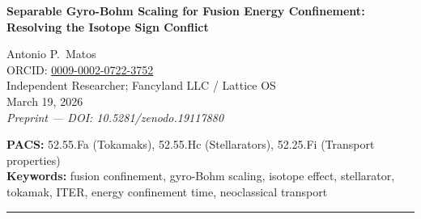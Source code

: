 \documentclass[11pt,letterpaper]{article}
\begin{document}
\begin{center}
{\LARGE\bfseries Separable Gyro-Bohm Scaling for Fusion Energy Confinement:\\[0.3em] Resolving the Isotope Sign Conflict}

\vspace{1.5em}

{\large Antonio P.\ Matos}\\[0.5em]
{\small ORCID: \href{https://orcid.org/0009-0002-0722-3752}{0009-0002-0722-3752}}\\[0.3em]
{\small Independent Researcher; Fancyland LLC / Lattice OS}\\[1em]
{\small March 19, 2026}\\[0.5em]
{\small\textit{Preprint --- DOI: 10.5281/zenodo.19117880}}

\vspace{1em}

{\small\textbf{PACS:} 52.55.Fa (Tokamaks), 52.55.Hc (Stellarators), 52.25.Fi (Transport properties)}\\[0.3em]
{\small\textbf{Keywords:} fusion confinement, gyro-Bohm scaling, isotope effect, stellarator, tokamak, ITER, energy confinement time, neoclassical transport}
\end{center}

\vspace{1em}
\hrule
\vspace{1em}
\end{document}
